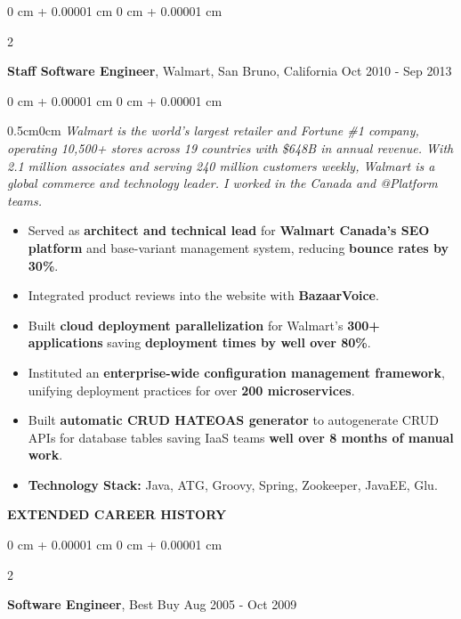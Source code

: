 \documentclass[10pt, letterpaper]{article}
\newenvironment{highlights}{
    \begin{itemize}[
        topsep=0.10 cm,
        parsep=0.10 cm,
        partopsep=0pt,
        itemsep=0pt,
        leftmargin=0 cm + 10pt
    ]
}{
    \end{itemize}
} %
\newenvironment{onecolentry}{
    \begin{adjustwidth}{
        0 cm + 0.00001 cm
    }{
        0 cm + 0.00001 cm
    }
}{
    \end{adjustwidth}
} %
\newenvironment{twocolentry}[2][]{
    \onecolentry
    \def\secondColumn{#2}
    \setcolumnwidth{\fill, 4.5 cm}
    \begin{paracol}{2}
}{
    \switchcolumn \raggedleft \secondColumn
    \end{paracol}
    \endonecolentry
} %
\begin{document}
        \vspace{0.20 cm}
        \begin{twocolentry}{
            Oct 2010 - Sep 2013
        }
            \textbf{Staff Software Engineer}, Walmart, San Bruno, California\end{twocolentry}
        \vspace{0.10 cm}
        \begin{onecolentry}
            \begin{adjustwidth}{0.5cm}{0cm}
            \textit{Walmart is the world's largest retailer and Fortune \#1 company, operating 10,500+ stores across 19 countries with \$648B in annual revenue. With 2.1 million associates and serving 240 million customers weekly, Walmart is a global commerce and technology leader. I worked in the Canada and @Platform teams.}
            \end{adjustwidth}

            \vspace{0.10 cm}
            \begin{highlights}
                \item Served as \textbf{architect and technical lead} for \textbf{Walmart Canada's SEO platform} and base-variant management system, reducing \textbf{bounce rates by 30\%}.
                \item Integrated product reviews into the website with \textbf{BazaarVoice}.
                \item Built \textbf{cloud deployment parallelization} for Walmart's \textbf{300+ applications} saving \textbf{deployment times by well over 80\%}.
                \item Instituted an \textbf{enterprise-wide configuration management framework}, unifying deployment practices for over \textbf{200 microservices}.
                \item Built \textbf{automatic CRUD HATEOAS generator} to autogenerate CRUD APIs for database tables saving IaaS teams \textbf{well over 8 months of manual work}.
                \item \textbf{Technology Stack:} Java, ATG, Groovy, Spring, Zookeeper, JavaEE, Glu.
            \end{highlights}
        \end{onecolentry}

        \vspace{0.20 cm}
        \textbf{EXTENDED CAREER HISTORY}

        \vspace{0.10 cm}
        \begin{twocolentry}{
            Aug 2005 - Oct 2009
        }
            \textbf{Software Engineer}, Best Buy\end{twocolentry}
\end{document}
